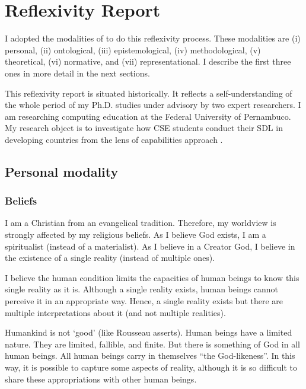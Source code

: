 \section{Reflexivity Report}
\label{reflexivity:report}

I adopted the modalities of  to do this reflexivity process. These modalities are (i) personal, (ii) ontological, (iii) epistemological, (iv) methodological, (v) theoretical, (vi) normative, and (vii) representational. I describe the first three ones in more detail in the next sections.

This reflexivity report is situated historically. It reflects a self-understanding of the whole period of my Ph.D. studies under advisory by two expert researchers. I am researching computing education at the Federal University of Pernambuco. My research object is to investigate how \gls{CSE} students conduct their \gls{SDL} in developing countries from the lens of capabilities approach \cite{sen:1992,robeyns:2023}.

\subsection{Personal modality}

\subsubsection{Beliefs}
\label{reflex-sss:beliefs}

I am a Christian from an evangelical tradition. Therefore, my worldview is strongly affected by my religious beliefs. As I believe God exists, I am a spiritualist (instead of a materialist). As I believe in a Creator God, I believe in the existence of a single reality (instead of multiple ones). 

I believe the human condition limits the capacities of human beings to know this single reality as it is. Although a single reality exists, human beings cannot perceive it in an appropriate way. Hence, a single reality exists but there are multiple interpretations about it (and not multiple realities). 

Humankind is not ‘good’ (like Rousseau asserts). Human beings have a limited nature. They are limited, fallible, and finite. But there is something of God in all human beings. All human beings carry in themselves “the God-likeness”. In this way, it is possible to capture some aspects of reality, although it is so difficult to share these appropriations with other human beings.

